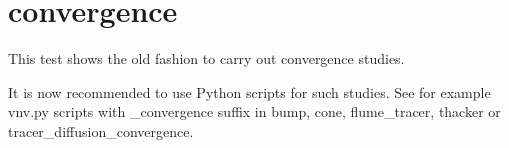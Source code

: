 \chapter{convergence}

This test shows the old fashion to carry out convergence studies.

It is now recommended to use Python scripts for such studies.
See for example vnv.py scripts with \_convergence suffix in bump, cone, flume\_tracer,
thacker or tracer\_diffusion\_convergence.
